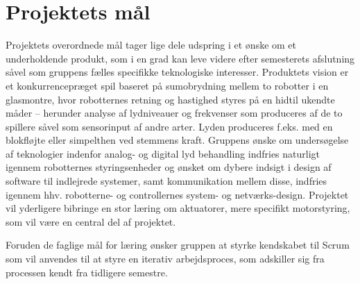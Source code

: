 \section{Projektets mål} 

Projektets overordnede mål tager lige dele udspring i et ønske om et underholdende produkt, som i en grad kan leve videre efter semesterets afslutning såvel som gruppens fælles specifikke teknologiske interesser.
Produktets vision er et konkurrencepræget spil baseret på sumobrydning mellem to robotter i en glasmontre, hvor robotternes retning og hastighed styres på en hidtil ukendte måder – herunder analyse af lydniveauer og frekvenser som produceres af de to spillere såvel som sensorinput af andre arter.
Lyden produceres f.eks. med en blokfløjte eller simpelthen ved stemmens kraft.
Gruppens ønske om undersøgelse af teknologier indenfor analog- og digital lyd behandling indfries naturligt igennem robotternes styringsenheder og ønsket om dybere indsigt i design af software til indlejrede systemer, samt kommunikation mellem disse, indfries igennem hhv. robotterne- og controllernes system- og netværks-design.
Projektet vil yderligere bibringe en stor læring om aktuatorer, mere specifikt motorstyring, som vil være en central del af projektet.

Foruden de faglige mål for læring ønsker gruppen at styrke kendskabet til Scrum som vil anvendes til at styre en iterativ arbejdsproces, som adskiller sig fra processen kendt fra tidligere semestre. 